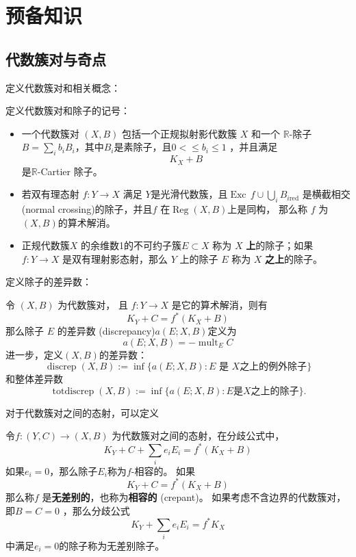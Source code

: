 \chapter{预备知识}
\section{代数簇对与奇点}
定义代数簇对和相关概念：
\begin{definition}
  定义代数簇对和除子的记号：
  \begin{itemize}
    \item 一个代数簇对 $(X,B)$ 包括一个正规拟射影代数簇 $X$ 和一个 $\mathbb{R}$-除子 $B=\sum_{i}b_{i}B_{i}$，其中$B_{i}$是素除子，且$0<\leqslant b_{i} \leqslant 1$ ，并且满足
    \[ K_{X}+B \]
          是$\mathbb{R}$-Cartier 除子。 
    \item 若双有理态射 $f:Y\to X$ 满足 $Y$是光滑代数簇，且$\operatorname{Exc}\,f \cup \bigcup_{i}B_{i \text{red}} $ 是横截相交 (normal crossing)的除子，并且$f$ 在$\operatorname{Reg}(X,B)$上是同构， 那么称 $f$ 为 $(X,B)$的算术解消。  
    \item 正规代数簇$X$ 的余维数1的不可约子簇$ E \subset X $ 称为 $X$ \textbf{上}的除子；如果 $f: Y \to X$ 是双有理射影态射，那么 $Y$ 上的除子 $E$ 称为 $X$ \textbf{之上}的除子。  
  \end{itemize}
\end{definition}

定义除子的差异数：
\begin{definition}
  令 $(X, B)$ 为代数簇对， 且 $f: Y\to X$ 是它的算术解消，则有
  \[ K_{Y}+C=f^*(K_{X}+B) \]
  那么除子 $E$ 的差异数 (discrepancy)$a(E;X,B) $定义为
  \[ a(E;X,B)=-\operatorname{mult}_{E}C \]
  进一步，定义$(X,B) $的差异数：
  \[ \operatorname{discrep}(X, B) := \inf\{a(E; X, B) : E \text{ 是 } X \text{之上的例外除子} \} \]
  和整体差异数
  \[ \operatorname{totdiscrep}(X, B) :=\inf \{a(E; X, B) : E \text{是} X \text{之上的除子}\}. \]
\end{definition}
对于代数簇对之间的态射，可以定义
\begin{definition}
 令$f:(Y,C)\to (X,B)$ 为代数簇对之间的态射，在分歧公式中，
 \[ K_{Y}+C + \sum_{i}e_{i}E_{i}=f^{*}(K_{X}+B) \]
 如果$e_{i}=0$，那么除子$E_{i}$称为$f$-相容的。 如果
 \[ K_{Y}+C=f^{*}(K_{X}+B) \]
那么称$f$ 是\textbf{无差别的}，也称为\textbf{相容的}  (crepant)。
如果考虑不含边界的代数簇对，即$B=C=0$ ，那么分歧公式
 \[ K_{Y} + \sum_{i}e_{i}E_{i}=f^{*}K_{X} \]
 中满足$e_{i}=0$的除子称为无差别除子。
\end{definition}

